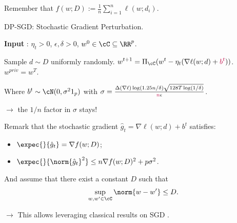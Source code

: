 \documentclass[notheorems]{beamer}
\begin{document}
\begin{frame}
  Remember that $f(w; D) := \frac 1n \sum_{i=1}^n \ell(w; d_i)$.

  \vspace{1em}

  \begin{algorithm}[H]
    \caption{DP-SGD: Stochastic Gradient Perturbation.}
    \label{algo:bassily-erm}
    \textbf{Input} : $\eta_t > 0$, $\epsilon, \delta > 0$, $w^0 \in \cC \subseteq \RR^p$.
    \begin{algorithmic}[1]
      \State Sample $d \sim D$ uniformly randomly.
      \State $\displaystyle w^{t+1} = \Pi_\cC(w^t - \eta_t (\nabla \ell(w; d) + {\color{purple}b^t}))$.
      \EndFor \\
      \Return $w^{priv} = w^T$.
    \end{algorithmic}
  \end{algorithm}

  Where $b^t \sim \cN(0, \sigma^2 1_p)$ with $\sigma = \frac{\Delta(\nabla \ell) \log(1.25n/\delta) \sqrt{128T\log(1/\delta)}}{{\color{purple}n}\epsilon}$.

  \quad $\rightarrow$ the $1/n$ factor in $\sigma$ stays!
\end{frame}

\begin{frame}
  Remark that the stochastic gradient $\hat g_t = \nabla \ell(w; d) + b^t$ satisfies:
  \begin{itemize}
  \item $\expec{}{\hat g_t} = \nabla f(w; D)$;
  \item $\expec{}{\norm{\hat g_t}^2} \le n\nabla f(w; D)^2 + p\sigma^2$.
  \end{itemize}

  \vspace{1em}

  And assume that there exist a constant $D$ such that
  \begin{align*}
    \sup_{w,w'\in \cC} \norm{w - w'} \le D.
  \end{align*}

  \vspace{1em}

  \quad $\rightarrow$ This allows leveraging classical results on SGD .
\end{frame}
\end{document}
